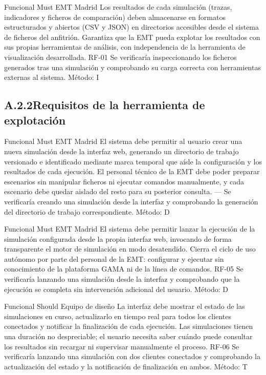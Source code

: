 {Funcional}
{Must}
{EMT Madrid}
{Los resultados de cada simulación (trazas, indicadores y ficheros de comparación) deben almacenarse en formatos
estructurados y abiertos (CSV y JSON) en directorios accesibles desde el sistema de ficheros del anfitrión.}
{Garantiza que la EMT pueda explotar los resultados con sus propias herramientas de análisis, con independencia
de la herramienta de visualización desarrollada.}
{RF-01}
{Se verificaría inspeccionando los ficheros generados tras una simulación y comprobando su carga correcta con
herramientas externas al sistema. Método: I}

\subsection*{A.2.2\quad Requisitos de la herramienta de explotación}

{Funcional}
{Must}
{EMT Madrid}
{El sistema debe permitir al usuario crear una nueva simulación desde la interfaz web, generando un directorio de
trabajo versionado e identificado mediante marca temporal que aísle la configuración y los resultados de cada ejecución.}
{El personal técnico de la EMT debe poder preparar escenarios sin manipular ficheros ni ejecutar comandos manualmente,
y cada escenario debe quedar aislado del resto para su posterior consulta.}
{---}
{Se verificaría creando una simulación desde la interfaz y comprobando la generación del directorio de trabajo
correspondiente. Método: D}

{Funcional}
{Must}
{EMT Madrid}
{El sistema debe permitir lanzar la ejecución de la simulación configurada desde la propia interfaz web,
invocando de forma transparente el motor de simulación en modo desatendido.}
{Cierra el ciclo de uso autónomo por parte del personal de la EMT: configurar y ejecutar sin conocimiento
de la plataforma GAMA ni de la línea de comandos.}
{RF-05}
{Se verificaría lanzando una simulación desde la interfaz y comprobando que la ejecución se completa sin
intervención adicional del usuario. Método: D}

{Funcional}
{Should}
{Equipo de diseño}
{La interfaz debe mostrar el estado de las simulaciones en curso, actualizarlo en tiempo real para todos
los clientes conectados y notificar la finalización de cada ejecución.}
{Las simulaciones tienen una duración no despreciable; el usuario necesita saber cuándo puede consultar
los resultados sin recargar ni supervisar manualmente el proceso.}
{RF-06}
{Se verificaría lanzando una simulación con dos clientes conectados y comprobando la actualización del estado
y la notificación de finalización en ambos. Método: T}

